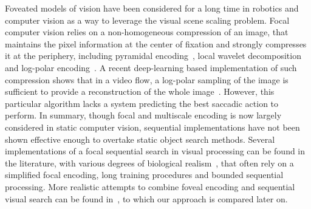 Foveated models of vision have been considered for a long time in robotics and computer vision as a way to leverage the visual scene scaling problem. Focal computer vision relies on a non-homogeneous compression of an image, that maintains the pixel information at the center of fixation and strongly compresses it at the periphery, including pyramidal encoding~\cite{kortum1996implementation,Butko2010infomax}, local wavelet decomposition~\cite{dauce2018active} and log-polar encoding~\cite{fischer2007self,Traver10}.
A recent deep-learning based implementation of such compression shows that in a video flow, a log-polar sampling of the image is sufficient to provide a reconstruction of the whole image~\cite{Kaplanyan19}. However, this particular algorithm lacks a system predicting the best saccadic action to perform. In summary, though focal and multiscale encoding is now largely considered in static computer vision, sequential implementations have not been shown effective enough to overtake static object search methods.
Several implementations of a focal sequential search in visual processing can be found in the literature, with various degrees of biological realism~\cite{mnih2014recurrent,fu2017look}, that often rely on a simplified focal encoding, long training procedures and bounded sequential processing. More realistic attempts to combine foveal encoding and sequential visual search can be found in~\cite{Butko2010infomax,denil2012learning,dauce2018active}, {\color{black} to which our approach is compared later on}.

